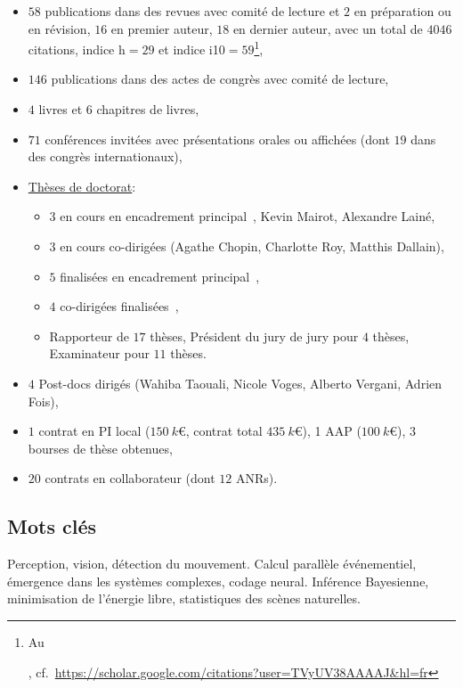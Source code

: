 \documentclass[10pt,french,a4paper,oneside]{article}%
\begin{document}
\begin{itemize}

\item	$58$ publications dans des revues avec comité de lecture et $2$ en préparation ou en révision, $16$ en premier auteur, $18$ en dernier auteur, avec un total de $4046$ citations, indice h$=29$ et indice i10$=59$\footnote{Au \date{\today}, cf.~\url{https://scholar.google.com/citations?user=TVyUV38AAAAJ&hl=fr}},
\item	$146$ publications dans des actes de congrès avec comité de lecture,
\item	$4$ livres et $6$ chapitres de livres,
\item	$71$ conférences invitées avec présentations orales
ou affichées (dont $19$ dans des congrès internationaux),
\item \href{https://www.theses.fr/074493701}{Thèses de doctorat}:
\begin{itemize}
	\item $3$ en cours en encadrement principal~\citep{Jeremie25thesis}, Kevin Mairot, Alexandre Lainé, 
	\item $3$ en cours co-dirigées (Agathe Chopin, Charlotte Roy, Matthis Dallain),
	\item $5$ finalisées en encadrement principal~\citep{Khoei14thesis,Boutin20thesis,Franciosini21thesis,Ladret24thesis,Grimaldi24thesis},
	\item $4$ co-dirigées finalisées~\citep{Kremkow09thesis,Damasse18thesis,MansourPour19thesis,Gruel23thesis},
	\item Rapporteur de $17$ thèses, Président du jury de jury pour $4$ thèses, Examinateur pour $11$ thèses.
\end{itemize} %
\item $4$ Post-docs dirigés (Wahiba Taouali, Nicole Voges, Alberto Vergani, Adrien Fois),
\item $1$ contrat en PI local ($150~k$\euro{}, contrat total $435~k$\euro{}), 1 AAP ($100~k$\euro{}), $3$ bourses de thèse obtenues,
\item $20$ contrats en collaborateur (dont $12$ ANRs).

\end{itemize} %

\subsection*{Mots clés}
Perception, vision, détection du mouvement. Calcul parallèle événementiel, émergence dans les systèmes complexes, codage neural. Inférence Bayesienne, minimisation de l'énergie libre, statistiques des scènes naturelles.
\end{document}
